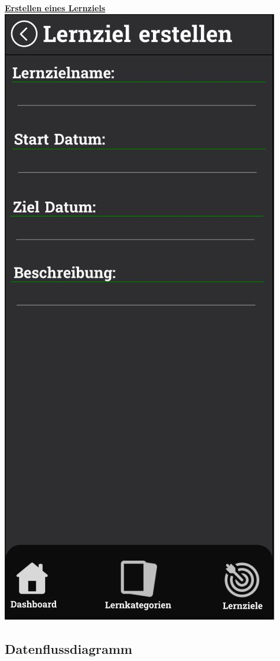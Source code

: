    \newpage
    \begin{center}
        \underline{\textbf{Erstellen eines Lernziels}}\\
        \includegraphics[width=.5\textwidth]{images/Mockups/LernzielErstellen.JPG}
    \end{center}
    
    \subsection{Datenflussdiagramm}


